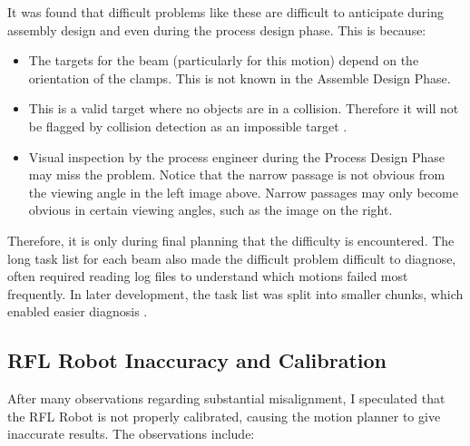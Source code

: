 It was found that difficult problems like these are difficult to anticipate during assembly design and even during the process design phase. This is because:

\begin{itemize}
	\item The targets for the beam (particularly for this motion) depend on the orientation of the clamps. This is not known in the Assemble Design Phase.

	\item This is a valid target where no objects are in a collision. Therefore it will not be flagged by collision detection as an impossible target .

	\item Visual inspection by the process engineer during the Process Design Phase may miss the problem. Notice that the narrow passage is not obvious from the viewing angle in the left image above. Narrow passages may only become obvious in certain viewing angles, such as the image on the right.

\end{itemize}
Therefore, it is only during final planning that the difficulty is encountered. The long task list for each beam also made the difficult problem difficult to diagnose, often required reading log files to understand which motions failed most frequently. In later development, the task list was split into smaller chunks, which enabled easier diagnosis . 

\subsection{RFL Robot Inaccuracy and Calibration}
\label{subsection:exploration-3-rfl-robot-inaccuracy-and-calibration}

After many observations regarding substantial misalignment, I speculated that the RFL Robot is not properly calibrated, causing the motion planner to give inaccurate results. The observations include:

